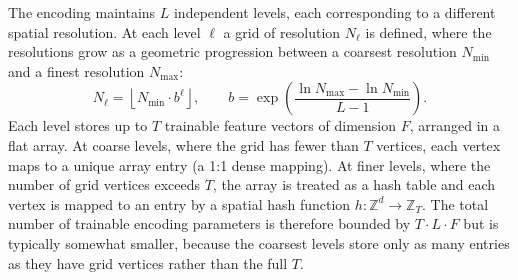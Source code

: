 \documentclass[12pt, a4paper, twoside]{report}
\begin{document}
The encoding maintains $L$ independent levels, each corresponding to a different spatial resolution. At each level $\ell$ a grid of resolution $N_\ell$ is defined, where the resolutions grow as a geometric progression between a coarsest resolution $N_\mathrm{min}$ and a finest resolution $N_\mathrm{max}$:
%
\begin{equation}
    N_\ell = \left\lfloor N_\mathrm{min} \cdot b^\ell \right\rfloor,
    \qquad
    b = \exp\!\left(\frac{\ln N_\mathrm{max} - \ln N_\mathrm{min}}{L - 1}\right).
    \label{eq:hash_resolution}
\end{equation}
%
Each level stores up to $T$ trainable feature vectors of dimension $F$, arranged in a flat array. At coarse levels, where the grid has fewer than $T$ vertices, each vertex maps to a unique array entry (a 1:1 dense mapping). At finer levels, where the number of grid vertices exceeds $T$, the array is treated as a hash table and each vertex is mapped to an entry by a spatial hash function $h : \mathbb{Z}^d \to \mathbb{Z}_T$. The total number of trainable encoding parameters is therefore bounded by $T \cdot L \cdot F$ but is typically somewhat smaller, because the coarsest levels store only as many entries as they have grid vertices rather than the full $T$.
\end{document}

